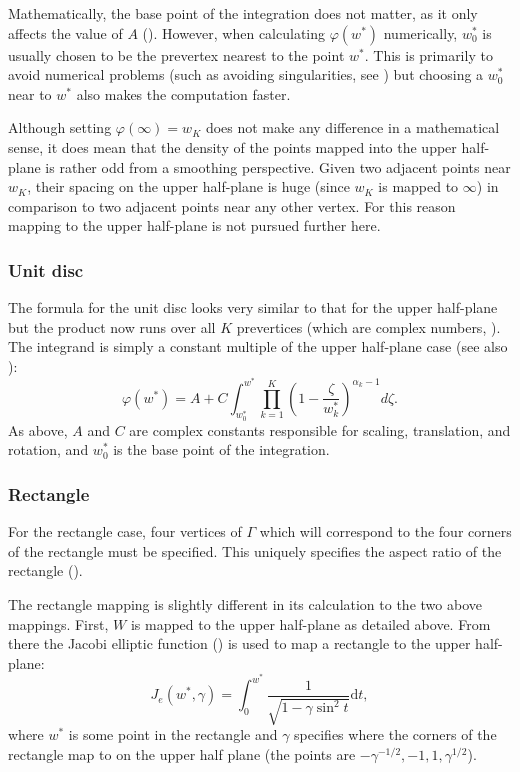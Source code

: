 Mathematically, the base point of the integration does not matter, as it only affects the value of $A$ (\cite[p. 3]{driscoll}).\label{cor-3s14-3} However, when calculating $\varphi(w^*)$ numerically, $w^*_0$\label{cor-3s14-2} is usually chosen to be the prevertex nearest to the point $w^*$. This is primarily to avoid numerical problems (such as avoiding singularities, see ) but choosing a $w^*_0$ near to $w^*$ also makes the computation faster.

Although setting $\varphi(\infty) = w_K$ does not make any difference in a mathematical sense, it does mean that the density of the points mapped into the upper half-plane is rather odd from a smoothing perspective. Given two adjacent points near $w_K$, their spacing on the upper half-plane is huge (since $w_K$ is mapped to $\infty$) in comparison to two adjacent points \label{cor-e6}near any other vertex. For this reason mapping to the upper half-plane is not pursued further here.

\subsubsection{Unit disc}

The formula for the unit disc looks very similar to that for the upper half-plane but the product now runs over all $K$ prevertices (which are complex numbers, )\label{cor-3s13-3}. The integrand is simply a constant multiple of the upper half-plane case (see also \cite[p. 12]{driscoll}):\label{cor-e5}
\begin{equation}
\label{unitscmap}
\varphi(w^*) = A + C \int^{w^*}_{w^*_0} \prod_{k=1}^{K} \left (1 - \frac{\zeta}{w^*_k} \right )^{\alpha_k-1} d\zeta.
\end{equation}
As above, $A$ and $C$ are complex constants responsible for scaling, translation, and rotation, and $w^*_0$ is the base point of the integration.

\subsubsection{Rectangle}

For the rectangle case, four vertices of $\Gamma$ which will correspond to the four corners of the rectangle must be specified. This uniquely specifies the aspect ratio of the rectangle (\cite[p. 48]{driscoll}).

The rectangle mapping is slightly different in its calculation to the two above mappings. First, $W$\label{cor-3s15} is mapped to the upper half-plane as detailed above. From there the Jacobi elliptic function (\cite[p. 701]{handbuch}) is used to map a rectangle to the upper half-plane:
\begin{equation*}
J_e(w^*,\gamma)=\int_0^{w^*} \frac{1}{\sqrt{1-\gamma\sin^2t}} \text{d} t,
\end{equation*}
where $w^*$ is some point in the rectangle and $\gamma$ specifies where the corners of the rectangle map to on the upper half plane (the points are $-\gamma^{-1/2}, -1, 1, \gamma^{1/2}$). 

